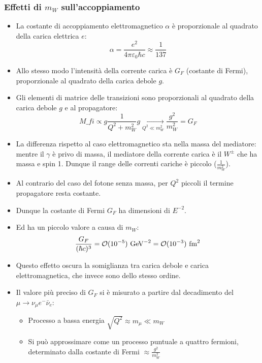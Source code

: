 \subsubsection{Effetti di $m_W$ sull'accoppiamento}
\begin{itemize}
\item La costante di accoppiamento elettromagnetico $\alpha$ è proporzionale al quadrato della carica elettrica $e$:
\begin{equation*}
\alpha=\frac{e^2}{4\pi\varepsilon_0\hbar c}\approx\frac{1}{137}
\end{equation*}
\item Allo stesso modo l'intensità della corrente carica è $G_F$ (costante di Fermi), proporzionale al quadrato della carica debole $g$.
\item Gli elementi di matrice delle transizioni sono proporzionali al quadrato della carica debole $g$ e al propagatore:
\begin{equation*}
M\_{fi}\propto g\frac{1}{Q^2+m_W^2}g\underset{Q^2\ll m_W^2}{\longrightarrow}\frac{g^2}{m_W^2}=G_F
\end{equation*}
\item La differenza rispetto al caso elettromagnetico sta nella massa del mediatore: mentre il $\gamma$ è privo di massa, il mediatore della corrente carica è il $W^\pm$ che ha massa e spin 1. Dunque il range delle correnti cariche è piccolo ($\frac{1}{m_W^2}$). 
\item Al contrario del caso del fotone senza massa, per $Q^2$ piccoli il termine propagatore resta costante.
\item Dunque la costante di Fermi $G_F$ ha dimensioni di $E^{-2}$. 
\item Ed ha un piccolo valore a causa di $m_W$:
\begin{equation*}
\frac{G_F}{(\hbar c)^3}=\mathcal{O}(10^{-5})\textnormal{ GeV}^{-2}=\mathcal{O}(10^{-3})\textnormal{ fm}^2
\end{equation*}
\item Questo effetto oscura la somiglianza tra carica debole e carica elettromagnetica, che invece sono dello stesso ordine.
\item Il valore più preciso di $G_F$ si è misurato a partire dal decadimento del $\mu\to \nu_\mu e^-\bar\nu_e$:
    \begin{itemize}
        \item Processo a bassa energia $\sqrt{Q^2}\approx m_\mu\ll m_W$
        \item Si può approssimare come un processo puntuale a quattro fermioni, determinato dalla costante di Fermi $\approx \frac{g^2}{m_W^2}$

\end{itemize}
\end{itemize}
